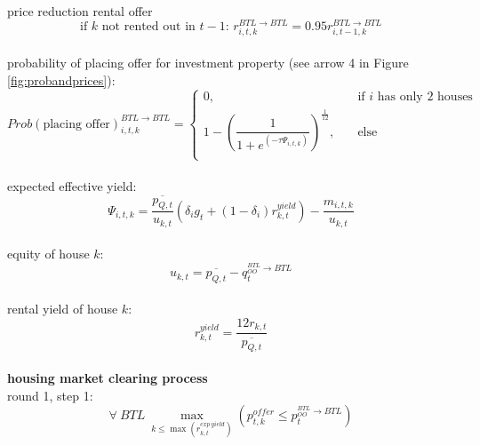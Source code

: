 \documentclass[]{article}
\begin{document}
\\
price reduction rental offer%
\begin{equation}\label{eq:r_p_red}
\text{if $k$ not rented out in $t-1$: }r^{BTL \rightarrow BTL}_{i,t,k}= 0.95r^{BTL \rightarrow BTL}_{i,t-1,k}
\end{equation}
\\
probability of placing offer for investment property (see arrow 4 in Figure \ref{fig:probandprices}):
\begin{equation} \label{eq:probability_divest}
Prob(\text{placing offer})^{BTL\rightarrow BTL}_{i,t,k} = 
\begin{cases}
0, &\quad \text{if $i$ has only 2 houses} \\
1 - \left(\dfrac{1}{1+e^{(-\tau\Psi_{i,t,k})}}\right)^{\frac{1}{12}},&\quad \text{else} \\
\end{cases}
\end{equation}
\\
expected effective yield:
\begin{equation} \label{eq:expected_yield_sell}
\Psi_{i,t,k} = \frac{\overline{p_{Q,t}}}{u_{k,t}}(\delta_{i}g_{t} + (1-\delta_{i}) r^{yield}_{k,t}) - \frac{m_{i,t,k}}{u_{k,t}}
\end{equation}
\\
equity of house $k$:
\begin{equation} \label{eq:equity}
u_{k, t} = \overline{p_{Q,t}} - q^{^{BTL}_{OO}\rightarrow BTL}_{t}
\end{equation}
\\
rental yield of house $k$:
\begin{equation}\label{eq:rental_yield_k}
	r^{yield}_{k,t}= \frac{12r_{k,t}}{\overline{p_{Q,t}}}
\end{equation}
\\
\textbf{housing market clearing process}\\
round 1, step 1:
\begin{equation*}
\forall\  BTL\ \max_{k\leq \max\left(r^{exp\ yield}_{k,t}\right)} \left(p^{offer}_{t,k}\leq p^{^{BTL}_{OO}\rightarrow BTL}_{t}\right) 
\end{equation*}
\end{document}
